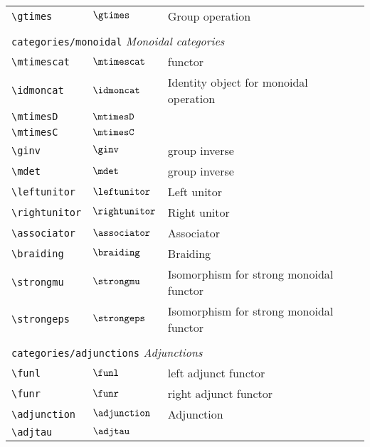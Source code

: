 \begin{longtable}{lll}
 {\color[rgb]{0.5,0.5,0.5}\texttt{\textbackslash gtimes}} & $\gtimes$ &  Group operation\\ 
  &  & \\ 
 \multicolumn{3}{l}{{\color[rgb]{0.5,0.5,0.5}\texttt{categories/monoidal}} \emph{Monoidal categories}}\\ 
 \hline
{\color[rgb]{0.5,0.5,0.5}\texttt{\textbackslash mtimescat}} & $\mtimescat$ &  functor\\ 
 {\color[rgb]{0.5,0.5,0.5}\texttt{\textbackslash idmoncat}} & $\idmoncat$ &  Identity object for monoidal operation\\ 
 {\color[rgb]{0.5,0.5,0.5}\texttt{\textbackslash mtimesD}} & $\mtimesD$ & \\ 
 {\color[rgb]{0.5,0.5,0.5}\texttt{\textbackslash mtimesC}} & $\mtimesC$ & \\ 
 {\color[rgb]{0.5,0.5,0.5}\texttt{\textbackslash ginv}} & $\ginv$ &  group inverse\\ 
 {\color[rgb]{0.5,0.5,0.5}\texttt{\textbackslash mdet}} & $\mdet$ &  group inverse\\ 
 {\color[rgb]{0.5,0.5,0.5}\texttt{\textbackslash leftunitor}} & $\leftunitor$ &  Left unitor\\ 
 {\color[rgb]{0.5,0.5,0.5}\texttt{\textbackslash rightunitor}} & $\rightunitor$ &  Right unitor\\ 
 {\color[rgb]{0.5,0.5,0.5}\texttt{\textbackslash associator}} & $\associator$ &  Associator\\ 
 {\color[rgb]{0.5,0.5,0.5}\texttt{\textbackslash braiding}} & $\braiding$ &  Braiding\\ 
 {\color[rgb]{0.5,0.5,0.5}\texttt{\textbackslash strongmu}} & $\strongmu$ &  Isomorphism for strong monoidal functor\\ 
 {\color[rgb]{0.5,0.5,0.5}\texttt{\textbackslash strongeps}} & $\strongeps$ &  Isomorphism for strong monoidal functor\\ 
  &  & \\ 
 \multicolumn{3}{l}{{\color[rgb]{0.5,0.5,0.5}\texttt{categories/adjunctions}} \emph{Adjunctions}}\\ 
 \hline
{\color[rgb]{0.5,0.5,0.5}\texttt{\textbackslash funl}} & $\funl$ &  left adjunct functor\\ 
 {\color[rgb]{0.5,0.5,0.5}\texttt{\textbackslash funr}} & $\funr$ &  right adjunct functor\\ 
 {\color[rgb]{0.5,0.5,0.5}\texttt{\textbackslash adjunction}} & $\adjunction$ &  Adjunction\\ 
 {\color[rgb]{0.5,0.5,0.5}\texttt{\textbackslash adjtau}} & $\adjtau$ & \\ 

\end{longtable}
